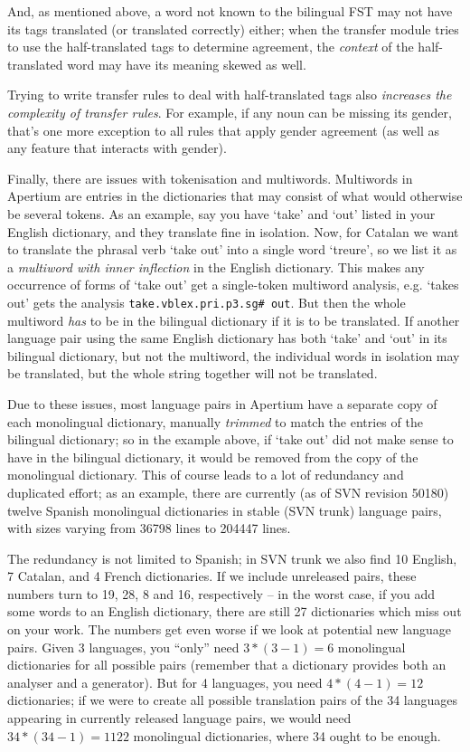 \documentclass[10pt, a4paper]{article}
\newcommand{\ana}[1]{\texttt{#1}}
\newcommand{\f}[1]{`#1'}
\begin{document}
And, as mentioned above, a word not known to the bilingual FST may not
have its tags translated (or translated correctly) either; when the
transfer module tries to use the half-translated tags to determine
agreement, the \emph{context} of the half-translated word may have its
meaning skewed as well.

Trying to write transfer rules to deal with half-translated tags also
\emph{increases the complexity of transfer rules}. For example, if any
noun can be missing its gender, that's one more exception to all rules
that apply gender agreement (as well as any feature that interacts with
gender).

Finally, there are issues with tokenisation and multiwords.
Multiwords in Apertium are entries in the dictionaries that may
consist of what would otherwise be several tokens. As an example, say
you have \f{take} and \f{out} listed in your English dictionary, and
they translate fine in isolation. Now, for Catalan we want to
translate the phrasal verb \f{take out} into a single word \f{treure},
so we list it as a \emph{multiword with inner inflection} in the
English dictionary. This makes any occurrence of forms of \f{take out}
get a single-token multiword analysis, e.g. \f{takes out} gets the
analysis \ana{take.vblex.pri.p3.sg\# out}. But then the whole multiword
\emph{has} to be in the bilingual dictionary if it is to be
translated. If another language pair using the same English dictionary
has both \f{take} and \f{out} in its bilingual dictionary, but not the
multiword, the individual words in isolation may be translated, but
the whole string together will not be translated.

Due to these issues, most language pairs in Apertium have a separate
copy of each monolingual dictionary, manually \emph{trimmed} to match
the entries of the bilingual dictionary; so in the example above, if
\f{take out} did not make sense to have in the bilingual dictionary,
it would be removed from the copy of the monolingual dictionary. This
of course leads to a lot of redundancy and duplicated effort; as an
example, there are currently (as of SVN revision 50180) twelve Spanish
monolingual dictionaries in stable (SVN trunk) language pairs, with
sizes varying from 36798 lines to 204447 lines.

The redundancy is not limited to Spanish; in SVN trunk we also find 10
English, 7 Catalan, and 4 French dictionaries. If we include
unreleased pairs, these numbers turn to 19, 28, 8 and 16, respectively
-- in the worst case, if you add some words to an English dictionary,
there are still 27 dictionaries which miss out on your work.  The
numbers get even worse if we look at potential new language pairs.
Given 3 languages, you ``only'' need $3*(3-1)=6$ monolingual
dictionaries for all possible pairs (remember that a dictionary
provides both an analyser and a generator). But for 4 languages, you
need $4*(4-1)=12$ dictionaries; if we were to  create all possible
translation pairs of the 34 languages appearing in currently released
language pairs, we would need $34*(34-1)=1122$ monolingual dictionaries,
where 34 ought to be enough.
\end{document}
